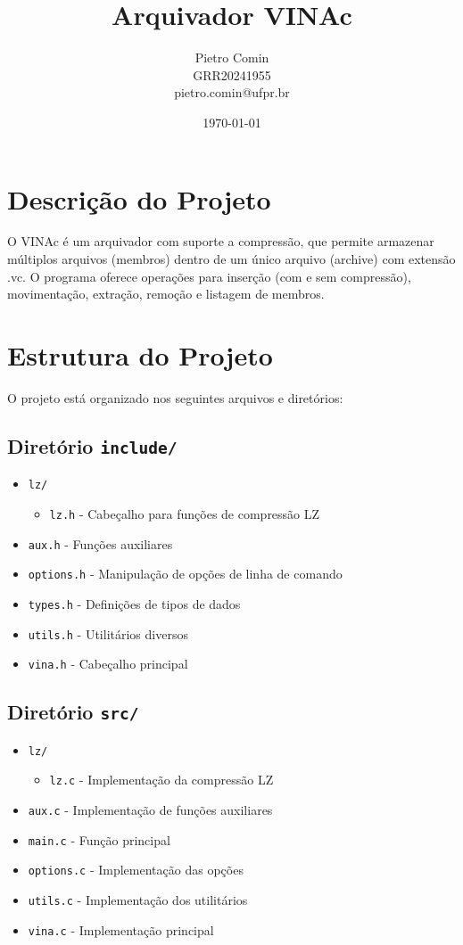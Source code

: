 \documentclass{article}
\title{Arquivador VINAc}
\author{Pietro Comin \\ GRR20241955 \\ pietro.comin@ufpr.br}
\date{\today}
\begin{document}
\maketitle

\section{Descrição do Projeto}
O VINAc é um arquivador com suporte a compressão, que permite armazenar múltiplos arquivos (membros) dentro de um único arquivo (archive) com extensão .vc. O programa oferece operações para inserção (com e sem compressão), movimentação, extração, remoção e listagem de membros.

\section{Estrutura do Projeto}
O projeto está organizado nos seguintes arquivos e diretórios:

\subsection{Diretório \texttt{include/}}
\begin{itemize}
    \item \texttt{lz/}
    \begin{itemize}
        \item \texttt{lz.h} - Cabeçalho para funções de compressão LZ
    \end{itemize}
    \item \texttt{aux.h} - Funções auxiliares
    \item \texttt{options.h} - Manipulação de opções de linha de comando
    \item \texttt{types.h} - Definições de tipos de dados
    \item \texttt{utils.h} - Utilitários diversos
    \item \texttt{vina.h} - Cabeçalho principal
\end{itemize}

\subsection{Diretório \texttt{src/}}
\begin{itemize}
    \item \texttt{lz/}
    \begin{itemize}
        \item \texttt{lz.c} - Implementação da compressão LZ
    \end{itemize}
    \item \texttt{aux.c} - Implementação de funções auxiliares
    \item \texttt{main.c} - Função principal
    \item \texttt{options.c} - Implementação das opções
    \item \texttt{utils.c} - Implementação dos utilitários
    \item \texttt{vina.c} - Implementação principal
\end{itemize}
\end{document}
